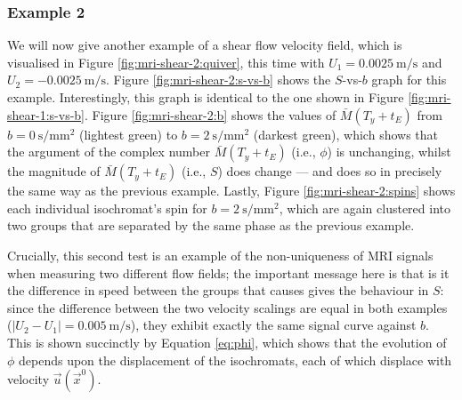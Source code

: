             \subsubsection{Example 2} \label{sec:numerical-mri:manufactured:shear:2}
                We will now give another example of a shear flow velocity field, which is visualised in Figure \ref{fig:mri-shear-2:quiver}, this time with $U_1 = \qty{0.0025}{\metre\per\second}$ and $U_2 = \qty{-0.0025}{\metre\per\second}$. Figure \ref{fig:mri-shear-2:s-vs-b} shows the $S$-vs-$b$ graph for this example. Interestingly, this graph is identical to the one shown in Figure \ref{fig:mri-shear-1:s-vs-b}. Figure \ref{fig:mri-shear-2:b} shows the values of $\bar{M}(T_y + t_E)$ from $b=\qty{0}{\second\per\milli\metre^2}$ (lightest green) to $b=\qty{2}{\second\per\milli\metre^2}$ (darkest green), which shows that the argument of the complex number $\bar{M}(T_y + t_E)$ (i.e., $\phi$) is unchanging, whilst the magnitude of $\bar{M}(T_y + t_E)$ (i.e., $S$) does change --- and does so in precisely the same way as the previous example. Lastly, Figure \ref{fig:mri-shear-2:spins} shows each individual isochromat's spin for $b = \qty{2}{\second\per\milli\metre^2}$, which are again clustered into two groups that are separated by the same phase as the previous example.
                
                Crucially, this second test is an example of the non-uniqueness of MRI signals when measuring two different flow fields; the important message here is that is it the difference in  speed between the groups that causes gives the behaviour in $S$: since the difference between the two velocity scalings are equal in both examples ($|U_2 - U_1| = \qty{0.005}{\metre\per\second}$), they exhibit exactly the same signal curve against $b$. This is shown succinctly by Equation \eqref{eq:phi}, which shows that the evolution of $\phi$ depends upon the displacement of the isochromats, each of which displace with velocity $\vec{u}(\vec{x}^0)$.

